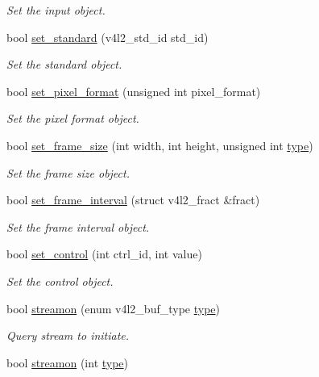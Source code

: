 \begin{DoxyCompactItemize}
\begin{DoxyCompactList}\small\item\em Set the input object. \end{DoxyCompactList}\item 
bool \hyperlink{classv4lcap_a5ce097aed8f4d0aee209e0c78924812d}{set\+\_\+standard} (v4l2\+\_\+std\+\_\+id std\+\_\+id)
\begin{DoxyCompactList}\small\item\em Set the standard object. \end{DoxyCompactList}\item 
bool \hyperlink{classv4lcap_a7da8705c4a542bb1118f74435957c471}{set\+\_\+pixel\+\_\+format} (unsigned int pixel\+\_\+format)
\begin{DoxyCompactList}\small\item\em Set the pixel format object. \end{DoxyCompactList}\item 
bool \hyperlink{classv4lcap_a6ad01c926c3162e858e030c8525cb94b}{set\+\_\+frame\+\_\+size} (int width, int height, unsigned int \hyperlink{classstd_1_1conditional_1_1type}{type})
\begin{DoxyCompactList}\small\item\em Set the frame size object. \end{DoxyCompactList}\item 
bool \hyperlink{classv4lcap_a698e7d4dcefeda932ecbab7bfccdc491}{set\+\_\+frame\+\_\+interval} (struct v4l2\+\_\+fract \&fract)
\begin{DoxyCompactList}\small\item\em Set the frame interval object. \end{DoxyCompactList}\item 
bool \hyperlink{classv4lcap_a863a15d2d66cc0b7367dcc9cba64e0bd}{set\+\_\+control} (int ctrl\+\_\+id, int value)
\begin{DoxyCompactList}\small\item\em Set the control object. \end{DoxyCompactList}\item 
bool \hyperlink{classv4lcap_abb1f77b86c0368cd40dab1fb8d4a2565}{streamon} (enum v4l2\+\_\+buf\+\_\+type \hyperlink{classstd_1_1conditional_1_1type}{type})
\begin{DoxyCompactList}\small\item\em Query stream to initiate. \end{DoxyCompactList}\item 
bool \hyperlink{classv4lcap_a171600fdcef434fc621e62d9373fcaf8}{streamon} (int \hyperlink{classstd_1_1conditional_1_1type}{type})

\end{DoxyCompactItemize}
